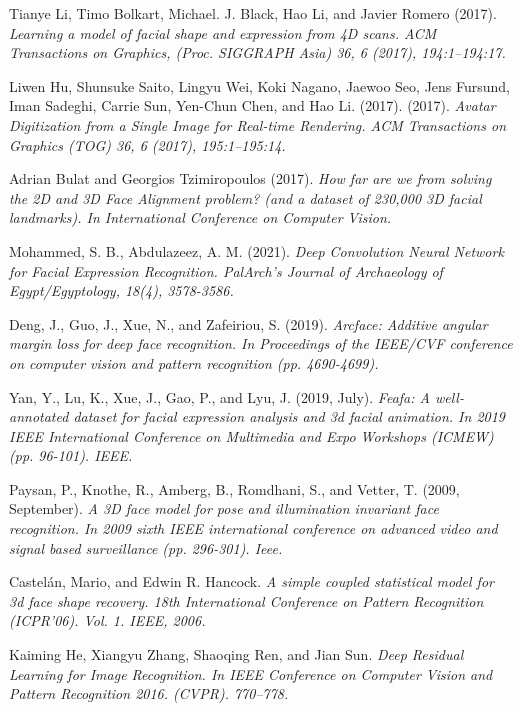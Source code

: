 \documentclass[12pt,a4]{article}
\begin{document}
\begin{thebibliography}{9}
	Tianye Li, Timo Bolkart, Michael. J. Black, Hao Li, and Javier Romero
	(2017).
	\textit{Learning a model of facial shape and expression from 4D scans.
		ACM Transactions on Graphics, (Proc. SIGGRAPH Asia) 36, 6 (2017),
		194:1–194:17.}
	
	Liwen Hu, Shunsuke Saito, Lingyu Wei, Koki Nagano, Jaewoo Seo, Jens
	Fursund, Iman Sadeghi, Carrie Sun, Yen-Chun Chen, and Hao Li. (2017).
	(2017).
	\textit{Avatar Digitization from a Single Image for Real-time Rendering. ACM
		Transactions on Graphics (TOG) 36, 6 (2017), 195:1–195:14.}
	
	Adrian Bulat and Georgios Tzimiropoulos (2017).
	\textit{How far are we from solving the 2D and 3D Face Alignment problem? (and a dataset of 230,000 3D facial landmarks). In International Conference on Computer Vision.}
	
	Mohammed, S. B., Abdulazeez, A. M. (2021).
	\textit{Deep Convolution Neural
		Network for Facial Expression Recognition. PalArch’s Journal of Archaeology of Egypt/Egyptology, 18(4), 3578-3586.}
	
	Deng, J., Guo, J., Xue, N., and Zafeiriou, S. (2019).
	\textit{Arcface: Additive angular margin loss for deep face recognition. In Proceedings of the
		IEEE/CVF conference on computer vision and pattern recognition (pp.
		4690-4699).}
	
	Yan, Y., Lu, K., Xue, J., Gao, P., and Lyu, J. (2019, July).
	\textit{Feafa: A
		well-annotated dataset for facial expression analysis and 3d facial animation. In 2019 IEEE International Conference on Multimedia and Expo
		Workshops (ICMEW) (pp. 96-101). IEEE.}
	
	Paysan, P., Knothe, R., Amberg, B., Romdhani, S., and Vetter, T. (2009, September).
	\textit{A 3D face model for pose and illumination invariant
		face recognition. In 2009 sixth IEEE international conference on advanced
		video and signal based surveillance (pp. 296-301). Ieee.}

	Castelán, Mario, and Edwin R. Hancock.
	\textit{A simple coupled statistical model for 3d face shape recovery. 18th International Conference on Pattern Recognition (ICPR'06). Vol. 1. IEEE, 2006.}


	Kaiming He, Xiangyu Zhang, Shaoqing Ren, and Jian Sun.
	\textit{Deep Residual Learning for Image Recognition. In IEEE Conference on Computer Vision and Pattern Recognition  2016. (CVPR). 770–778.}


\end{thebibliography}
\end{document}

